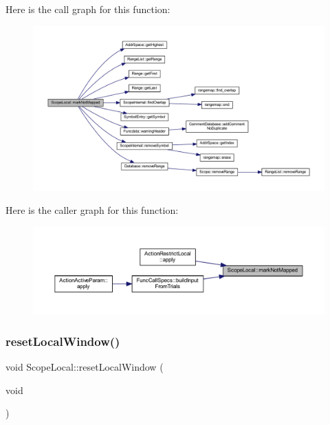 Here is the call graph for this function\+:
\nopagebreak
\begin{figure}[H]
\begin{center}
\leavevmode
\includegraphics[width=350pt]{class_scope_local_a560ea5441b79ef3c17b890c7d37ccaf1_cgraph}
\end{center}
\end{figure}
Here is the caller graph for this function\+:
\nopagebreak
\begin{figure}[H]
\begin{center}
\leavevmode
\includegraphics[width=350pt]{class_scope_local_a560ea5441b79ef3c17b890c7d37ccaf1_icgraph}
\end{center}
\end{figure}
\mbox{\label{class_scope_local_a3bf9941188eb64423d2ed49a08dab8ca}} 
\subsubsection{\texorpdfstring{resetLocalWindow()}{resetLocalWindow()}}
{\footnotesize\ttfamily void Scope\+Local\+::reset\+Local\+Window (\begin{DoxyParamCaption}\item[{void}]{ }\end{DoxyParamCaption})}



